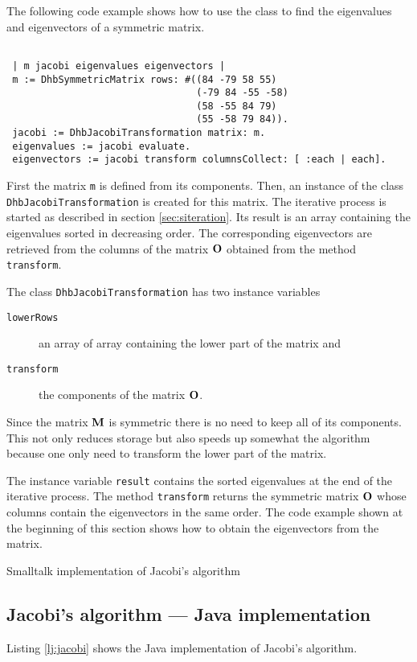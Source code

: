 \documentclass[twoside]{book}
\begin{document}
The following code example shows how to use the class to find the
eigenvalues and eigenvectors of a symmetric matrix.
\begin{codeExample}
\begin{verbatim}

 | m jacobi eigenvalues eigenvectors |
 m := DhbSymmetricMatrix rows: #((84 -79 58 55)
                                 (-79 84 -55 -58)
                                 (58 -55 84 79)
                                 (55 -58 79 84)).
 jacobi := DhbJacobiTransformation matrix: m.
 eigenvalues := jacobi evaluate.
 eigenvectors := jacobi transform columnsCollect: [ :each | each].
\end{verbatim}
\end{codeExample}
First the matrix {\tt m} is defined from its components. Then, an
instance of the class {\tt DhbJacobiTransformation} is created for
this matrix. The iterative process is started as described in
section \ref{sec:siteration}. Its result is an array containing
the eigenvalues sorted in decreasing order. The corresponding
eigenvectors are retrieved from the columns of the matrix ${\bf
O}$ obtained from the method {\tt transform}.

The class {\tt DhbJacobiTransformation} has two instance variables
\begin{description}
  \item[\tt lowerRows] an array of array containing the lower part
  of the matrix and
  \item[\tt transform] the components of the matrix ${\bf O}$.
\end{description}
Since the matrix ${\bf M}$ is symmetric there is no need to keep
all of its components. This not only reduces storage but also
speeds up somewhat the algorithm because one only need to
transform the lower part of the matrix.


The instance variable {\tt result} contains the sorted eigenvalues
at the end of the iterative process. The method {\tt transform}
returns the symmetric matrix ${\bf O}$ whose columns contain the
eigenvectors in the same order. The code example shown at the
beginning of this section shows how to obtain the eigenvectors
from the matrix.

\begin{listing} Smalltalk implementation of Jacobi's algorithm \label{ls:jacobi}

\end{listing}


\subsection{Jacobi's algorithm --- Java implementation}
Listing \ref{lj:jacobi} shows the Java implementation of Jacobi's
algorithm.
\end{document}

